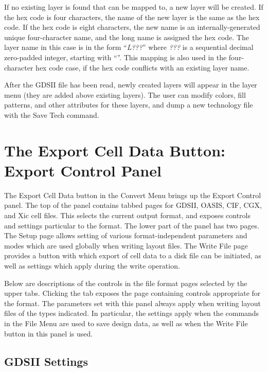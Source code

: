 If no existing layer is found that can be mapped to, a new layer will
be created.  If the hex code is four characters, the name of the new
layer is the same as the hex code.  If the hex code is eight
characters, the new name is an internally-generated unique
four-character name, and the long name is assigned the hex code.  The
layer name in this case is in the form ``{\it L???}'' where {\it ???}
is a sequential decimal zero-padded integer, starting with ``{}''.  This mapping is also used in the four-character hex code
case, if the hex code conflicts with an existing layer name.

After the GDSII file has been read, newly created layers will appear
in the layer menu (they are added above existing layers).  The user
can modify colors, fill patterns, and other attributes for these
layers, and dump a new technology file with the {\cb Save Tech}
command.


\section{The {\cb Export Cell Data} Button: {\cb Export Control} Panel}

The {\cb Export Cell Data} button in the {\cb Convert Menu} brings up
the {\cb Export Control} panel.  The top of the panel contains tabbed
pages for {\cb GDSII}, {\cb OASIS}, {\cb CIF}, {\cb CGX}, and {\cb Xic
cell files}.  This selects the current output format, and exposes
controls and settings particular to the format.  The lower part of the
panel has two pages.  The {\cb Setup} page allows setting of various
format-independent parameters and modes which are used globally when
writing layout files.  The {\cb Write File} page provides a button
with which export of cell data to a disk file can be initiated, as
well as settings which apply during the write operation.

Below are descriptions of the controls in the file format pages
selected by the upper tabs.  Clicking the tab exposes the page
containing controls appropriate for the format.  The parameters set
with this panel always apply when writing layout files of the types
indicated.  In particular, the settings apply when the commands in the
{\cb File Menu} are used to save design data, as well as when the {\cb
Write File} button in this panel is used.

\subsection{GDSII Settings}

